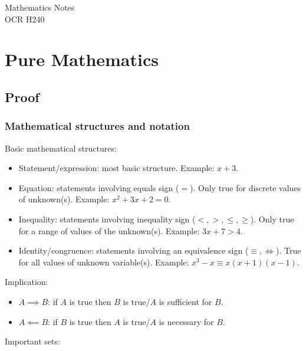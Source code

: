 \documentclass[a4paper]{report}
\begin{document}
\begin{titlepage}
	\raggedleft
	\vspace*{2cm}
	\Huge{Mathematics Notes}\\
	\vspace{0.5cm}
	\large{OCR H240}
\end{titlepage}

\tableofcontents

\part{Pure Mathematics}

\chapter{Proof}

\section{Mathematical structures and notation}

Basic mathematical structures:

\begin{itemize}
	\item{Statement/expression: most basic structure. Example: \( x + 3 \).}
	\item{Equation: statements involving equals sign (\( = \)). Only true for discrete values
		of unknown(s). Example: \( x^2 + 3x + 2 = 0 \).}
	\item{Inequality: statements involving inequality sign (\( <, >, \leq, \geq \)). Only true
		for a range of values of the unknown(s). Example: \( 3x + 7 > 4 \).}
	\item{Identity/congruence: statements involving an equivalence sign (\( \equiv, \iff \)).
		True for all values of unknown variable(s). Example:
		\( x^3 - x \equiv x(x + 1)(x - 1) \).}
\end{itemize}

Implication:

\begin{itemize}
	\item{\( A \implies B \): if \( A \) is true then \( B \) is true/\( A \) is sufficient
		for \( B \).}
	\item{\( A \impliedby B \): if \( B \) is true then \( A \) is true/\( A \) is necessary
		for \( B \).}
\end{itemize}

Important sets:
\end{document}
